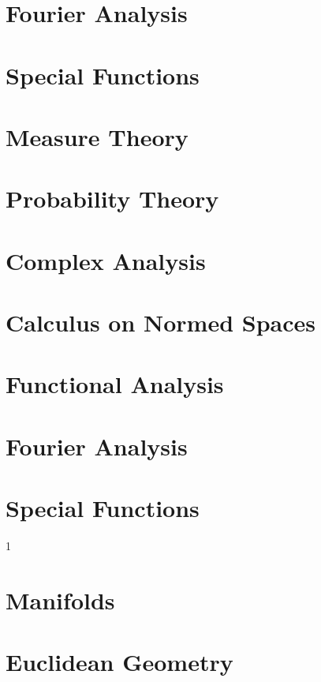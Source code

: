 \documentclass{book}                                                           %
\newcommand*{\TOPPATH}{books}
\newcommand*{\PATH}{\TOPPATH/}
\newcounter{endpage}
\def\compilegeometry{0}
\begin{document}
        \part{Fourier Analysis}
            
            
        \part{Special Functions}
            
            
    \else
        \part{Measure Theory}
        \part{Probability Theory}
        \part{Complex Analysis}
        \part{Calculus on Normed Spaces}
        \part{Functional Analysis}
        \part{Fourier Analysis}
        \part{Special Functions}
    \fi
    \clearpage

    \setcounter{endpage}{\thepage}
    \label{book:Geometry}%
    \renewcommand{\PATH}{\TOPPATH/Geometry}
    \setcounter{page}{\value{endpage}}

    \if\compilegeometry1
        \part{Manifolds}
            
        \part{Euclidean Geometry}
            
\end{document}
